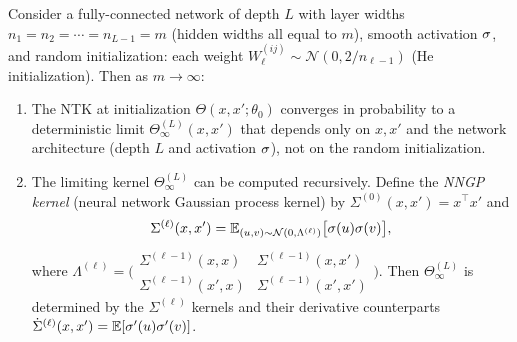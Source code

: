 \documentclass[11pt,a4paper]{article}
\begin{document}
\begin{theorem}
\label{thm:ntk-init}
Consider a fully-connected network of depth $L$ with layer widths
$n_1 = n_2 = \cdots = n_{L-1} = m$ (hidden widths all equal to $m$),
smooth activation $\sigma$, and random initialization: each weight
$W_\ell^{(ij)} \sim \mathcal{N}(0, 2/n_{\ell-1})$ (He initialization).
Then as $m \to \infty$:
\begin{enumerate}[nosep,label=(\roman*)]
  \item The NTK at initialization $\Theta(x, x'; \theta_0)$ converges
    in probability to a deterministic limit $\Theta_\infty^{(L)}(x, x')$
    that depends only on $x, x'$ and the network architecture (depth
    $L$ and activation $\sigma$), not on the random initialization.
  \item The limiting kernel $\Theta_\infty^{(L)}$ can be computed
    recursively.  Define the \emph{NNGP kernel} (neural network Gaussian
    process kernel) by $\Sigma^{(0)}(x, x') = x^\top x'$ and
    \begin{equation}
    \label{eq:nngp-recursion}
      \Sigma^{(\ell)}(x, x') = \mathbb{E}_{(u, v) \sim \mathcal{N}(0,
        \Lambda^{(\ell)})} \bigl[ \sigma(u) \sigma(v) \bigr],
    \end{equation}
    where $\Lambda^{(\ell)} = \bigl( \begin{smallmatrix}
    \Sigma^{(\ell-1)}(x,x) & \Sigma^{(\ell-1)}(x,x') \\
    \Sigma^{(\ell-1)}(x',x) & \Sigma^{(\ell-1)}(x',x')
    \end{smallmatrix} \bigr)$.  Then $\Theta_\infty^{(L)}$ is
    determined by the $\Sigma^{(\ell)}$ kernels and their
    derivative counterparts
    $\dot{\Sigma}^{(\ell)}(x, x') = \mathbb{E}[\sigma'(u)\sigma'(v)]$.
\end{enumerate}
\end{theorem}
\end{document}
